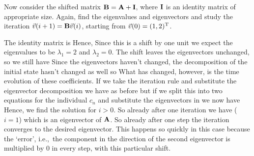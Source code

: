 \subquestion Now consider the shifted matrix ${\bf B}={\bf A}+{\bf I}$, where ${\bf I}$ is an identity matrix of appropriate size. Again, find the eigenvalues and eigenvectors and study the iteration $\vec{v}(i+1)={\bf B}\vec{v}(i)$, starting from $\vec{v}(0)=(1,2)^{\rm T}$.

\solution 
The identity matrix is 
Hence, 
Since this is a shift by one unit we expect the eigenvalues to be $\lambda_1 = 2$ and $\lambda_2=0$. The shift leaves the eigenvectors unchanged, so we still have 
Since the eigenvectors haven't changed, the decomposition of the initial state hasn't changed as well so 
What has changed, however, is the time evolution of these coefficients. If we take the iteration rule  
and substitute the eigenvector decomposition 
we have as before 
but if we split this into two equations for the individual $c_n$ and substitute the eigenvectors in we now have 
Hence, we find the solution 
for $i>0$. So already after one iteration we have ($i=1$) 
which is an eigenvector of $\bf A$. So already after one step the iteration converges to the desired eigenvector. This happens so quickly in this case because the `error', i.e.,~the component in the direction of the second eigenvector is multiplied by 0 in every step, with this particular shift. 
